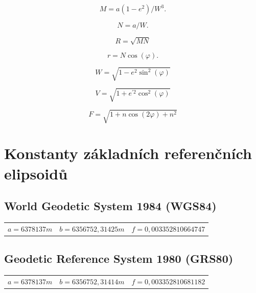 \documentclass[11pt,a4paper]{article}
\begin{document}
\begin{appendices}
\begin{equation}
M = a\left(1-e^{2}\right) / W^{3}.
\end{equation}

\begin{equation}
N = a/W.
\end{equation}

\begin{equation}
R = \sqrt{M N}
\end{equation}

\begin{equation}
r = N\cos{\left(\varphi\right)}.
\end{equation}

\begin{equation}
W = \sqrt{1-e^{2}\sin^{2}{\left(\varphi\right)}}
\end{equation}

\begin{equation}
V = \sqrt{1+e^{'2}\cos^{2}{\left(\varphi\right)}}
\end{equation}

\begin{equation}
F = \sqrt{1+n\cos{\left(2\varphi\right)}+n^{2}}
\end{equation}

\section{Konstanty základních referenčních elipsoidů} \label{appRefEllConst}

\subsection{World Geodetic System 1984 (WGS84)}\label{appRefEllConstWGS84}
\begin{table}[ht!]
\begin{tabular}{c c c}
$a = 6 378 137 m$ & $b = 6 356 752,31425 m$ & $f = 0,00335 28106 64747$ \\
\end{tabular}
\end{table}

\subsection{Geodetic Reference System 1980 (GRS80)}
\begin{table}[ht!]
\begin{tabular}{c c c}
$a = 6 378 137 m$ & $b = 6 356 752,31414 m$ & $f = 0,00335 28106 81182$ \\
\end{tabular}
\end{table}


\end{appendices}
\end{document}
